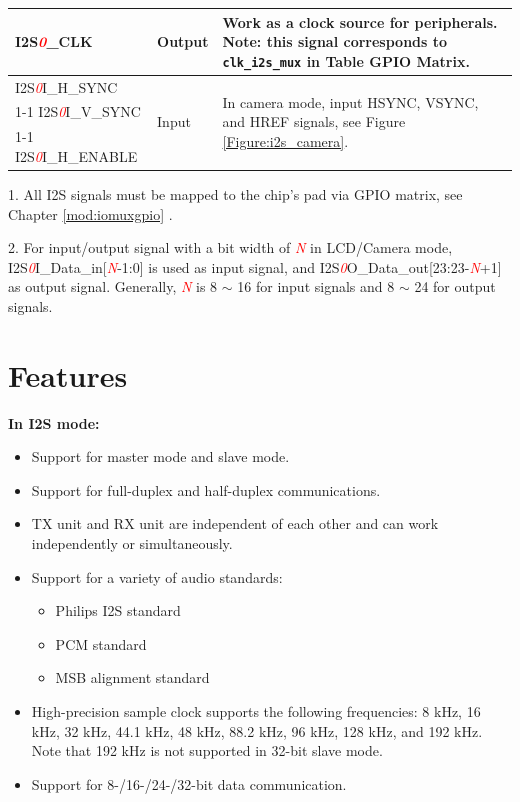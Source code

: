 \documentclass[main\_\_EN.tex]{subfiles}
\begin{document}
\begin{longtable}{|p{2.6cm}|p{1.5cm}|p{11.5cm}|}
\hline
\vspace{-0.4em}I2S\textcolor{red}{\it{0}}\_CLK       & \vspace{-0.4em}Output & Work as a clock source for peripherals. Note: this signal corresponds to \texttt{clk\_i2s\_mux} in Table GPIO Matrix. \\
\hline
\hline
I2S\textcolor{red}{\it{0}}I\_H\_SYNC   & \multirow{3}{*}{Input} & \multirow{3}{=}{In camera mode, input HSYNC, VSYNC, and HREF signals, see Figure \ref{Figure:i2s_camera}.} \\
\cline{1-1}
I2S\textcolor{red}{\it{0}}I\_V\_SYNC   &                        &  \\
\cline{1-1}
I2S\textcolor{red}{\it{0}}I\_H\_ENABLE &                        &  \\
\hline
\end{longtable}


\begin{tiplisting}
1. All I2S signals must be mapped to the chip's pad via GPIO matrix, see Chapter \ref{mod:iomuxgpio} \textit{}.

2. For input/output signal with a bit width of \textcolor{red}{\it{N}} in LCD/Camera mode, I2S\textcolor{red}{\it{0}}I\_Data\_in[\textcolor{red}{\it{N}}-1:0] is used as input signal, and I2S\textcolor{red}{\it{0}}O\_Data\_out[23:23-\textcolor{red}{\it{N}}+1] as output signal. Generally, \textcolor{red}{\it{N}} is 8 $ \sim $ 16 for input signals and 8 $ \sim $ 24 for output signals.
\end{tiplisting}

\section{Features}

\textbf{In I2S mode:}

\begin{itemize}
    \item Support for master mode and slave mode.
    \item Support for full-duplex and half-duplex communications.
    \item TX unit and RX unit are independent of each other and can work independently or simultaneously.
    \item Support for a variety of audio standards:
    \begin{itemize}
        \item Philips I2S standard
        \item PCM standard
        \item MSB alignment standard
    \end{itemize}
    \item High-precision sample clock supports the following frequencies: 8 kHz, 16 kHz, 32 kHz, 44.1 kHz, 48 kHz, 88.2 kHz, 96 kHz, 128 kHz, and 192 kHz. Note that 192 kHz is not supported in 32-bit slave mode.
    \item Support for 8-/16-/24-/32-bit data communication.

\end{itemize}
\end{document}
